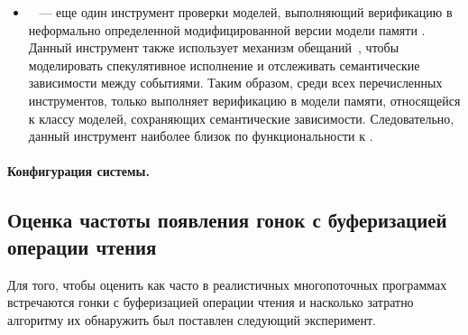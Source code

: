 \begin{itemize}
  \item \CDSChecker~\cite{Norris-Demsky:OOPSLA2013} --- 
    еще один инструмент проверки моделей, выполняющий верификацию 
    в неформально определенной модифицированной версии модели памяти \CMM.
    Данный инструмент также использует механизм обещаний~\cite{Kang-al:POPL17}, 
    чтобы моделировать спекулятивное исполнение и отслеживать
    семантические зависимости между событиями. 
    Таким образом, среди всех перечисленных инструментов,
    только \CDSChecker выполняет верификацию в модели памяти, 
    относящейся к классу моделей, сохраняющих семантические зависимости. 
    Следовательно, данный инструмент наиболее близок по функциональности к \wmc.

\end{itemize}

\paragraph{Конфигурация системы.} 
\TODO{}

\subsection*{Оценка частоты появления гонок с буферизацией операции чтения}

Для того, чтобы оценить как часто в реалистичных многопоточных
программах встречаются гонки с буферизацией операции чтения
и насколько затратно алгоритму \wmc их обнаружить 
был поставлен следующий эксперимент.


